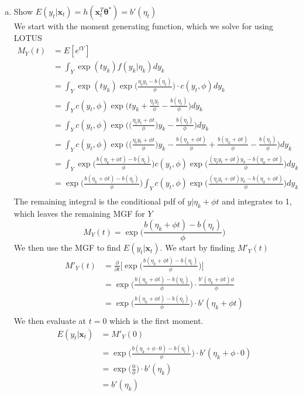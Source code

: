 \documentclass{article}
\renewcommand{\vec}[1]{\boldsymbol{#1}}
\newcommand{\pd}[2]{\frac{\partial#1}{\partial#2}}
\begin{document}
\begin{enumerate}[(a)]
\item Show $E(y_t|\vec{x}_t) = h(\vec{x}_t^T\vec{\theta}^*) = b'(\eta_t)$ \\
We start with the moment generating function, which we solve for using LOTUS
\begin{align*}
M_Y(t) &= E[e^{tY}]\\
&= \int_Y \exp(ty_k)f(y_k|\eta_k)dy_k\\
&= \int_Y \exp(ty_k)\exp\bigg(\frac{\eta_ty_t - b(\eta_t)}{\phi}\bigg)\cdot c(y_t, \phi)dy_k\\
&= \int_Y c(y_t, \phi)\exp\bigg(ty_k + \frac{\eta_ty_t}{\phi} - \frac{b(\eta_t)}{\phi}\bigg) dy_k\\
&= \int_Y c(y_t, \phi)\exp\bigg(\bigg(\frac{\eta_ty_t + \phi t}{\phi}\bigg)y_k - \frac{b(\eta_t)}{\phi}\bigg) dy_k\\
&= \int_Y c(y_t, \phi)\exp\bigg(\bigg(\frac{\eta_ty_t + \phi t}{\phi}\bigg)y_k - \frac{b(\eta_k + \phi t)}{\phi} + \frac{b(\eta_k + \phi t)}{\phi} - \frac{b(\eta_t)}{\phi}\bigg) dy_k\\
&= \int_Y \exp\bigg(\frac{b(\eta_k + \phi t) - b(\eta_t)}{\phi}\bigg)c(y_t, \phi)\exp\bigg(\frac{(\eta_ty_t + \phi t) y_k - b(\eta_k + \phi t)}{\phi}\bigg) dy_k\\
&= \exp\bigg(\frac{b(\eta_k + \phi t) - b(\eta_t)}{\phi}\bigg)\int_Y c(y_t, \phi)\exp\bigg(\frac{(\eta_ty_t + \phi t) y_k - b(\eta_k + \phi t)}{\phi}\bigg) dy_k\\
\end{align*}
The remaining integral is the conditional pdf of $y|\eta_k + \phi t$ and integrates to 1, which leaves the remaining MGF for $Y$
$$M_Y(t) = \exp\bigg(\frac{b(\eta_k + \phi t) - b(\eta_t)}{\phi}\bigg) $$
We then use the MGF to find $E(y_t|\vec{x}_t)$. We start by finding $M'_Y(t)$
\begin{align*}
M'_Y(t) &= \pd{}{t} \bigg[\exp\bigg(\frac{b(\eta_k + \phi t) - b(\eta_t)}{\phi}\bigg)\bigg]\\
&= \exp\bigg(\frac{b(\eta_k + \phi t) - b(\eta_t)}{\phi}\bigg)\cdot\frac{b'(\eta_k + \phi t)\phi}{\phi}\\
&= \exp\bigg(\frac{b(\eta_k + \phi t) - b(\eta_t)}{\phi}\bigg)\cdot b'(\eta_k + \phi t)\\
\end{align*}
We then evaluate at $t=0$ which is the first moment.
\begin{align*}
E(y_t|\vec{x}_t) &= M'_Y(0)\\
&= \exp\bigg(\frac{b(\eta_k + \phi\cdot 0) - b(\eta_t)}{\phi}\bigg)\cdot b'(\eta_k + \phi\cdot 0)\\
&= \exp\bigg(\frac{0}{\phi}\bigg)\cdot b'(\eta_k)\\
&= b'(\eta_k)\\
\end{align*}


\end{enumerate}
\end{document}
